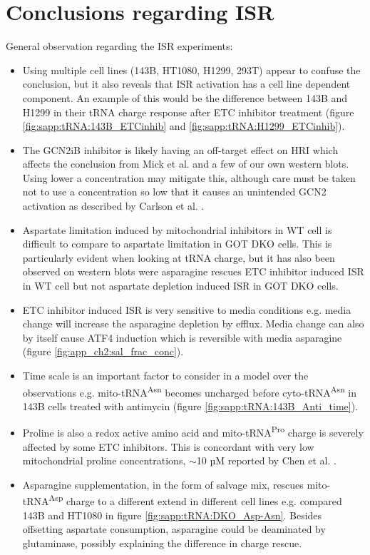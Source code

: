 \section{Conclusions regarding ISR}
General observation regarding the ISR experiments:
\begin{itemize}
    \item Using multiple cell lines (143B, HT1080, H1299, 293T) appear to confuse the conclusion, but it also reveals that ISR activation has a cell line dependent component.
    An example of this would be the difference between 143B and H1299 in their tRNA charge response after ETC inhibitor treatment (figure \ref{fig:sapp:tRNA:143B_ETCinhib} and \ref{fig:sapp:tRNA:H1299_ETCinhib}).
    \item The GCN2iB inhibitor is likely having an off-target effect on HRI which affects the conclusion from Mick et al. \cite{Mick2020-kf} and a few of our own western blots.
    Using lower a concentration may mitigate this, although care must be taken not to use a concentration so low that it causes an unintended GCN2 activation as described by Carlson et al. \cite{Carlson2023-zh}.
    \item Aspartate limitation induced by mitochondrial inhibitors in WT cell is difficult to compare to aspartate limitation in GOT DKO cells.
    This is particularly evident when looking at tRNA charge, but it has also been observed on western blots were asparagine rescues ETC inhibitor induced ISR in WT cell but not aspartate depletion induced ISR in GOT DKO cells.
    \item ETC inhibitor induced ISR is very sensitive to media conditions e.g. media change will increase the asparagine depletion by efflux.
    Media change can also by itself cause ATF4 induction which is reversible with media asparagine (figure \ref{fig:app_ch2:sal_frac_conc}).    
    \item Time scale is an important factor to consider in a model over the observations e.g. mito-tRNA\textsuperscript{Asn} becomes uncharged before cyto-tRNA\textsuperscript{Asn} in 143B cells treated with antimycin (figure \ref{fig:sapp:tRNA:143B_Anti_time}).
    \item Proline is also a redox active amino acid and mito-tRNA\textsuperscript{Pro} charge is severely affected by some ETC inhibitors.
    This is concordant with very low mitochondrial proline concentrations, $\sim$10 µM reported by Chen et al. \cite{Chen2016-mf}.
    \item Asparagine supplementation, in the form of salvage mix, rescues mito-tRNA\textsuperscript{Asp} charge to a different extend in different cell lines e.g. compared 143B and HT1080 in figure \ref{fig:sapp:tRNA:DKO_Asp-Asn}.
    Besides offsetting aspartate consumption, asparagine could be deaminated by glutaminase, possibly explaining the difference in charge rescue.
\end{itemize}



